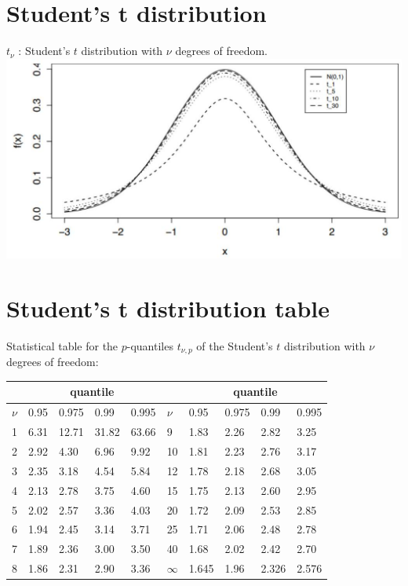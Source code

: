 \documentclass[10pt]{article}
\begin{document}
\section*{Student's t distribution}
$t_{\nu}$ : Student's $t$ distribution with $\nu$ degrees of freedom.\\
\includegraphics[max width=\textwidth, center]{2025_05_12_2c033a5f0417cd8b136fg-45}

\section*{Student's t distribution table}
Statistical table for the $p$-quantiles $t_{\nu, p}$ of the Student's $t$ distribution with $\nu$ degrees of freedom:

\begin{center}
\begin{tabular}{|l|l|l|l|l|l|l|l|l|l|}
\hline
 & \multicolumn{4}{|c|}{quantile} &  & \multicolumn{4}{|c|}{quantile} \\
\hline
$\nu$ & 0.95 & 0.975 & 0.99 & 0.995 & $\nu$ & 0.95 & 0.975 & 0.99 & 0.995 \\
\hline
1 & 6.31 & 12.71 & 31.82 & 63.66 & 9 & 1.83 & 2.26 & 2.82 & 3.25 \\
\hline
2 & 2.92 & 4.30 & 6.96 & 9.92 & 10 & 1.81 & 2.23 & 2.76 & 3.17 \\
\hline
3 & 2.35 & 3.18 & 4.54 & 5.84 & 12 & 1.78 & 2.18 & 2.68 & 3.05 \\
\hline
4 & 2.13 & 2.78 & 3.75 & 4.60 & 15 & 1.75 & 2.13 & 2.60 & 2.95 \\
\hline
5 & 2.02 & 2.57 & 3.36 & 4.03 & 20 & 1.72 & 2.09 & 2.53 & 2.85 \\
\hline
6 & 1.94 & 2.45 & 3.14 & 3.71 & 25 & 1.71 & 2.06 & 2.48 & 2.78 \\
\hline
7 & 1.89 & 2.36 & 3.00 & 3.50 & 40 & 1.68 & 2.02 & 2.42 & 2.70 \\
\hline
8 & 1.86 & 2.31 & 2.90 & 3.36 & $\infty$ & 1.645 & 1.96 & 2.326 & 2.576 \\
\hline
\end{tabular}
\end{center}
\end{document}
